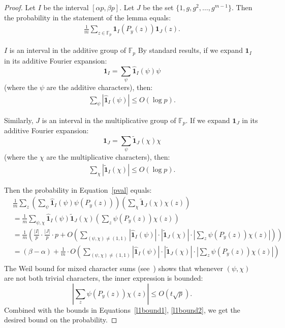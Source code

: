 \documentclass[10pt,a4paper]{article}
\newcommand{\F}{\mathbb{F}}
\newcommand{\one}{{\mathbf{1}}}
\begin{document}
\begin{proof}
 Let $I$ be the interval $[\alpha p, \beta p]$. Let $J$ be the set
 $\{1, g, g^2, \ldots, g^{m-1}\}$. Then the probability in the statement of the lemma equals:
 \begin{align}
 \label{pval}
 \frac{1}{m} \sum_{ z \in \F_p}  {\one}_{I}(P_y(z)){\one}_J(z).
 \end{align}
 
 $I$ is an interval in the additive group of $\F_p$
 By standard results, if we expand $\one_I$ in its additive Fourier expansion:
 $$ \one_I = \sum_\psi \widehat{\one}_I(\psi) \psi$$
 (where the $\psi$ are the additive characters), then:
 \begin{align}
 \label{l1bound1}
 \sum_{\psi } |\widehat{\one}_I(\psi)| \leq O( \log p).
 \end{align}
 
 Similarly, $J$ is an interval in the multiplicative group of $\F_p$.
 If we expand $\one_J$ in its additive Fourier expansion:
 $$ \one_J = \sum_\psi \widetilde{\one}_J(\chi) \chi$$
 (where the $\chi$ are the multiplicative characters), then:
 \begin{align}
 \label{l1bound2}
 \sum_{\chi} |\widetilde{\one}_I(\chi)| \leq O( \log p).
 \end{align}
 
 Then the probability in Equation~\eqref{pval} equals:
 \begin{align*} &\frac{1}{m}\sum_{z} \left( \sum_{\psi} \widehat{\one}_I(\psi) \psi(P_y(z)) \right) \left( \sum_{\chi} \widetilde{\one}_J(\chi) \chi(z) \right)\\
  &= \frac{1}{m}\sum_{\psi, \chi} \widehat{\one}_I(\psi) \widetilde{\one}_J(\chi) \left(\sum_{z} \psi(P_y(z)) \chi(z) \right)\\
  &= \frac{1}{m} \left( \frac{|I|}{p}\cdot \frac{|J|}{p} \cdot p + O\left(\sum_{(\psi, \chi) \neq (1,1)} |\widehat{\one}_I(\psi)|\cdot |\widetilde{\one}_J(\chi)| \cdot \left|\sum_{z} \psi(P_y(z)) \chi(z) \right|\right) \right)\\
  &= (\beta-\alpha) + \frac{1}{m} \cdot  O\left(\sum_{(\psi, \chi) \neq (1,1)} |\widehat{\one}_I(\psi)| \cdot | \widetilde{\one}_J(\chi) | \cdot \left|\sum_{z} \psi(P_y(z)) \chi(z) \right|\right) \\
 \end{align*}
The Weil bound for mixed character sums (see~\cite{Schmidtbook}) shows that whenever
$(\psi, \chi)$ are not both trivial characters, the inner expression is bounded:
$$\left|\sum_{z} \psi(P_y(z)) \chi(z) \right| \leq O( t \sqrt{p}).$$
Combined with the bounds in Equations~\eqref{l1bound1}, \eqref{l1bound2}, we get the desired bound on the probability.
\end{proof}
\end{document}

